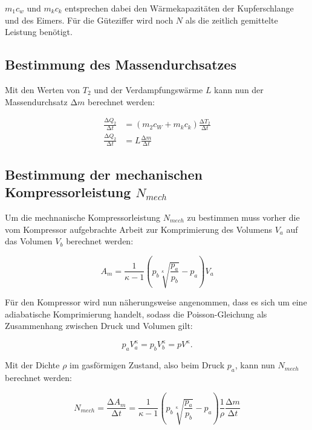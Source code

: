 $m_1c_w$ und $m_kc_k$ entsprechen dabei den Wärmekapazitäten der Kupferschlange und des Eimers.
Für die Güteziffer wird noch $N$ als die zeitlich gemittelte Leistung benötigt.

\subsection{Bestimmung des Massendurchsatzes}

Mit den Werten von $T_2$ und der Verdampfungswärme $L$ kann nun der Massendurchsatz $\increment m $
berechnet werden:

\begin{align}
  \label{eqn:Massendurchsatz}
  \frac{\increment Q_2}{\increment t} &= (m_2 c_W + m_k c_k) \frac{\increment T_2}{\increment t} \\
  \label{eqn:Massendurchsatz1}
  \frac{\increment Q_2}{\increment t} &= L \frac{\increment m}{\increment t}
\end{align}

\subsection{Bestimmung der mechanischen Kompressorleistung \texorpdfstring{$N_{mech}$}{t} }

Um die mechnanische Kompressorleistung $N_{mech}$ zu bestimmen muss vorher die vom Kompressor aufgebrachte
Arbeit zur Komprimierung des Volumens $V_a$ auf das Volumen $V_b$ berechnet werden:

\begin{equation}
  \label{eqn:Am}
  A_m = \frac{1}{\kappa - 1} \left( p_b \sqrt[\kappa]{\frac{p_a}{p_b}} - p_a \right) V_a
\end{equation}

Für den Kompressor wird nun näherungsweise angenommen, dass es sich um eine adiabatische Komprimierung handelt,
sodass die Poisson-Gleichung als Zusammenhang zwischen Druck und Volumen gilt:

\begin{equation}
  p_a V^{\kappa}_a = p_b V^{\kappa}_b = p V^{\kappa} .
\end{equation}

Mit der Dichte $\rho$ im gasförmigen Zustand, also beim Druck $p_a$, kann nun $N_{mech}$ berechnet werden:

\begin{equation}
  \label{eqn:Nmech}
  N_{mech} = \frac{\increment A_m}{\increment t} =  \frac{1}{\kappa - 1} \left( p_b \sqrt[\kappa]{\frac{p_a}{p_b}} - p_a \right) \frac{1}{\rho} \frac{\increment m}{\increment t}
\end{equation}

